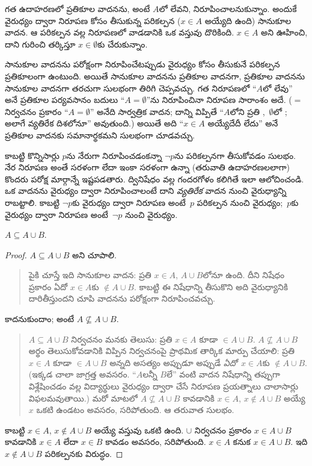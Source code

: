 \documentclass[../../../include/open-logic-section]{subfiles}
\begin{document}
గత ఉదాహరణలో ప్రతికూల వాదనను, అంటే $A$లో  లేవని, నిరూపించాలనుకున్నాం. అందుకే వైరుధ్యం ద్వారా నిరూపణ కోసం తీసుకున్న పరికల్పన ($x \in A$ అయ్యేది ఉంది) సానుకూల వాదన. ఆ పరికల్పన వల్ల నిరూపణలో వాడడానికి ఒక వస్తువు దొరికింది.
$x \in A$ అని ఊహించి, దాని గురించి తర్కిస్తూ $x \in \emptyset$కు చేరుకున్నాం.

సానుకూల వాదనను పరోక్షంగా నిరూపించేటప్పుడు వైరుధ్యం కోసం తీసుకునే పరికల్పన ప్రతికూలంగా ఉంటుంది. అయితే సానుకూల వాదనను ప్రతికూల వాదనగా, ప్రతికూల వాదనను సానుకూల వాదనగా తరచుగా సులభంగా తిరిగి చెప్పవచ్చు. గత నిరూపణలో ``$A$లో  లేవు'' అనే ప్రతికూల పర్యవసానం బదులు ``$A = \emptyset$''ను నిరూపించినా నిరూపణ సారాంశం అదే. ($=$ నిర్వచనం ప్రకారం ``$A = \emptyset$'' అనేది సార్వత్రిక వాదన; దాన్ని విప్పితే ``$A$లోని ప్రతి ,~$\emptyset$లో ; అలాగే వ్యతిరేక దిశలోనూ'' అవుతుంది.) అయితే అది ``$x \in A$ అయ్యేదేదీ లేదు'' అనే ప్రతికూల వాదనకు సమానార్థకమని సులభంగా చూడవచ్చు.

కాబట్టి కొన్నిసార్లు $p$ను నేరుగా నిరూపించడంకన్నా $\lnot p$ను పరికల్పనగా తీసుకోవడం సులభం. నేర నిరూపణ అంతే సరళంగా లేదా ఇంకా సరళంగా ఉన్నా (తరువాతి ఉదాహరణలలాగా) కొందరు పరోక్ష మార్గాన్నే ఇష్టపడతారు. ద్వినిషేధం వల్ల గందరగోళం కలిగితే ఇలా ఆలోచించండి. ఒక వాదనను వైరుధ్యం ద్వారా నిరూపించాలంటే దాని \emph{వ్యతిరేక} వాదన నుంచి వైరుధ్యాన్ని రాబట్టాలి. కాబట్టి $\lnot
p$కు వైరుధ్యం ద్వారా నిరూపణ అంటే~$p$ పరికల్పన నుంచి వైరుధ్యం;~$p$కు వైరుధ్యం ద్వారా నిరూపణ అంటే~$\lnot p$ నుంచి వైరుధ్యం.

\begin{prop}
$A \subseteq A \cup B$.
\end{prop}

\begin{proof}
  $A \subseteq A \cup B$ అని చూపాలి.
  \begin{quote}
    పైకి చూస్తే ఇది సానుకూల వాదన: ప్రతి $x \in A$, $A \cup B$లోనూ ఉంది. దీని నిషేధం ప్రకారం ఏదో $x \in A$కు $\notin A \cup B$. కాబట్టి ఈ నిషేధాన్ని తీసుకొని అది వైరుధ్యానికి దారితీస్తుందని చూపి వాదనను పరోక్షంగా నిరూపించవచ్చు.
  \end{quote}
  కాదనుకుందాం; అంటే $A \nsubseteq A \cup B$.
  \begin{quote}
    $A \subseteq A \cup B$ నిర్వచనం మనకు తెలుసు: ప్రతి $x \in A$ కూడా $\in A \cup B$. $A \nsubseteq A \cup B$ అర్థం తెలుసుకోవడానికి విప్పిన నిర్వచనంపై ప్రాథమిక తార్కిక మార్పు చేయాలి: ప్రతి $x \in A$ కూడా $\in
    A \cup B$ అన్నది అసత్యం అప్పుడూ అప్పుడే \emph{ఏదో}~$x \in A$కు $\notin A \cup B$. (ఇక్కడ చాలా జాగ్రత్త అవసరం. ``$A$లన్నీ $B$లే'' వంటి వాదన నిషేధాన్ని తప్పుగా విశ్లేషించడం వల్ల విద్యార్థులు వైరుధ్యం ద్వారా చేసే నిరూపణ ప్రయత్నాలు చాలాసార్లు విఫలమవుతాయి.) మరో మాటలో $A \nsubseteq A \cup B$ కావడానికి $x \in A$, $x \notin A \cup B$ అయ్యే $x$ ఒకటి ఉండటం అవసరం, సరిపోతుంది. ఆ తరువాత సులభం.
  \end{quote}
  కాబట్టి $x \in A$, $x \notin A \cup B$ అయ్యే వస్తువు ఒకటి ఉంది. $\cup$ నిర్వచనం ప్రకారం $x \in A \cup B$ కావడానికి $x \in A$ లేదా $x \in
  B$ కావడం అవసరం, సరిపోతుంది. $x \in A$ కనుక $x \in A \cup B$. ఇది $x \notin A \cup B$ పరికల్పనకు విరుద్ధం.
\end{proof}
\end{document}
